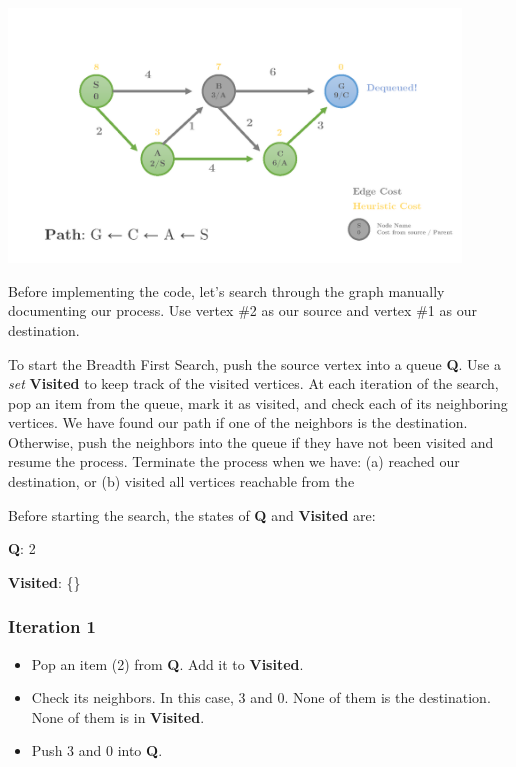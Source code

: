 \documentclass[12pt]{article}
\begin{document}
\begin{center}
  \includegraphics[width=0.9\textwidth]{heuristic1_Page6.png}
\end{center}

Before implementing the code, let's search through the graph manually documenting our process. Use vertex \#2 as our source and vertex \#1 as our destination.

\vspace{5mm} %

To start the Breadth First Search, push the source vertex into a queue \textbf{Q}. Use a \textit{set} \textbf{Visited} to keep track of the visited vertices. At each iteration of the search, pop an item from the queue, mark it as visited, and check each of its neighboring vertices. We have found our path if one of the neighbors is the destination. Otherwise, push the neighbors into the queue if they have not been visited and resume the process. Terminate the process when we have: (a) reached our destination, or (b) visited all vertices reachable from the 

Before starting the search, the states of \textbf{Q} and \textbf{Visited} are:

\textbf{Q}: 2

\textbf{Visited}: \{\}

\subsubsection*{Iteration 1}
\begin{itemize}
  \item Pop an item (2) from \textbf{Q}. Add it to \textbf{Visited}.
  \item Check its neighbors. In this case, 3 and 0. None of them is the destination. None of them is in \textbf{Visited}.
  \item Push 3 and 0 into \textbf{Q}.
\end{itemize}
\end{document}
